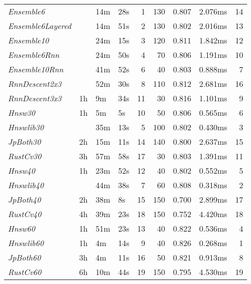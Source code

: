 \begin{tabular}{llllrrrlr}
\toprule
\midrule
\emph{Ensemble6} &  & 14m & 28s & 1 & 130 & 0.807 & 2.076ms & 14 \\
\emph{Ensemble6Layered} &  & 14m & 51s & 2 & 130 & 0.802 & 2.016ms & 13 \\
\emph{Ensemble10} &  & 24m & 15s & 3 & 120 & 0.811 & 1.842ms & 12 \\
\emph{Ensemble6Rnn} &  & 24m & 50s & 4 & 70 & 0.806 & 1.191ms & 10 \\
\emph{Ensemble10Rnn} &  & 41m & 52s & 6 & 40 & 0.803 & 0.888ms & 7 \\
\emph{RnnDescent2x3} &  & 52m & 30s & 8 & 110 & 0.812 & 2.681ms & 16 \\
\emph{RnnDescent3x3} & 1h & 9m & 34s & 11 & 30 & 0.816 & 1.101ms & 9 \\
\emph{Hnsw30} & 1h & 5m & 5s & 10 & 50 & 0.806 & 0.565ms & 6 \\
\emph{Hnswlib30} &  & 35m & 13s & 5 & 100 & 0.802 & 0.430ms & 3 \\
\emph{JpBoth30} & 2h & 15m & 11s & 14 & 140 & 0.800 & 2.637ms & 15 \\
\emph{RustCv30} & 3h & 57m & 58s & 17 & 30 & 0.803 & 1.391ms & 11 \\
\emph{Hnsw40} & 1h & 23m & 52s & 12 & 40 & 0.802 & 0.552ms & 5 \\
\emph{Hnswlib40} &  & 44m & 38s & 7 & 60 & 0.808 & 0.318ms & 2 \\
\emph{JpBoth40} & 2h & 38m & 8s & 15 & 150 & 0.700 & 2.899ms & 17 \\
\emph{RustCv40} & 4h & 39m & 23s & 18 & 150 & 0.752 & 4.420ms & 18 \\
\emph{Hnsw60} & 1h & 51m & 23s & 13 & 40 & 0.822 & 0.536ms & 4 \\
\emph{Hnswlib60} & 1h & 4m & 14s & 9 & 40 & 0.826 & 0.268ms & 1 \\
\emph{JpBoth60} & 3h & 4m & 11s & 16 & 50 & 0.821 & 0.913ms & 8 \\
\emph{RustCv60} & 6h & 10m & 44s & 19 & 150 & 0.795 & 4.530ms & 19 \\
\bottomrule
\end{tabular}
